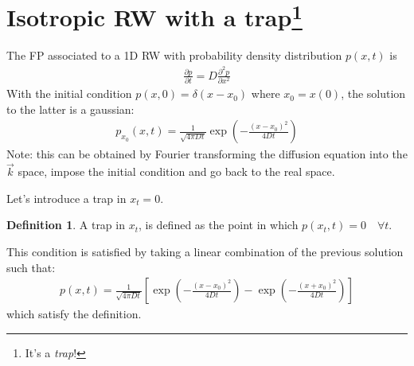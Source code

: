 \documentclass[4apaper,11pt,fleqn]{article}
\theoremstyle{remark}
\theoremstyle{definition}
\newtheorem*{dfn}{Definition}
\begin{document}
\section[Isotropic RW with a trap]{Isotropic RW with a trap\footnote{It's a \emph{trap}!} }
The FP associated to a 1D RW with  probability density distribution $p(x,t)$ is
\begin{align*}
  \frac{\partial p}{\partial t}=D \frac{\partial^{2} p}{\partial x^{2}}
\end{align*}
With the initial condition $p(x,0)=\delta(x-x_0)$ where $x_0 = x(0)$, the solution to the latter is a gaussian:
\begin{align*}
  p_{x_{0}}(x, t)=\frac{1}{\sqrt{4 \pi D t}} \exp \left(-\frac{\left(x-x_{0}\right)^{2}}{4 D t}\right)
\end{align*}
Note: this can be obtained by Fourier transforming the diffusion equation into the $\vec{k}$ space, impose the initial condition and go back to the real space.

Let's introduce a trap in $x_t = 0$.
\begin{dfn}
  A trap in $x_t$, is defined as the point in which $p(x_t,t)=0 \quad \forall t$.
\end{dfn}
This condition is satisfied by taking a linear combination of the previous solution such that:
\begin{align}
  \label{eq:sol_trap}
  p(x, t)=\frac{1}{\sqrt{4 \pi D t}}\left[\exp \left(-\frac{\left(x-x_{0}\right)^{2}}{4 D t}\right)-\exp \left(-\frac{\left(x+x_{0}\right)^{2}}{4 D t}\right)\right]
\end{align}
which satisfy the definition.
\end{document}
